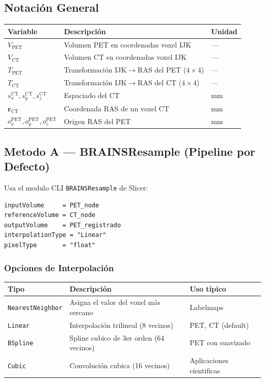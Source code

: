 \documentclass[12pt,a4paper]{article}
\begin{document}
\subsection{Notación General}

\begin{table}[H]
\centering
\begin{tabular}{lll}
\toprule
\textbf{Variable} & \textbf{Descripción} & \textbf{Unidad} \\
\midrule
$V_{\text{PET}}$ & Volumen PET en coordenadas voxel IJK & --- \\
$V_{\text{CT}}$ & Volumen CT en coordenadas voxel IJK & --- \\
$T_{\text{PET}}$ & Transformación IJK$\to$RAS del PET ($4\times4$) & --- \\
$T_{\text{CT}}$ & Transformación IJK$\to$RAS del CT ($4\times4$) & --- \\
$s_x^{\text{CT}}, s_y^{\text{CT}}, s_z^{\text{CT}}$ & Espaciado del CT & mm \\
$\mathbf{r}_{\text{CT}}$ & Coordenada RAS de un voxel CT & mm \\
$o_x^{\text{PET}}, o_y^{\text{PET}}, o_z^{\text{PET}}$ & Origen RAS del PET & mm \\
\bottomrule
\end{tabular}
\end{table}

\subsection{Metodo A --- BRAINSResample (Pipeline por Defecto)}

Usa el modulo CLI \texttt{BRAINSResample} de Slicer:

\begin{lstlisting}
inputVolume     = PET_node
referenceVolume = CT_node
outputVolume    = PET_registrado
interpolationType = "Linear"
pixelType       = "float"
\end{lstlisting}

\subsubsection{Opciones de Interpolación}

\begin{table}[H]
\centering
\begin{tabular}{l l l}
\toprule
\textbf{Tipo} & \textbf{Descripción} & \textbf{Uso típico} \\
\midrule
\texttt{NearestNeighbor} & Asigna el valor del voxel más cercano & Labelmaps \\
\texttt{Linear} & Interpolación trilineal (8 vecinos) & PET, CT (default) \\
\texttt{BSpline} & Spline cubico de 3er orden (64 vecinos) & PET con suavizado \\
\texttt{Cubic} & Convolución cubica (16 vecinos) & Aplicaciones cientificas \\
\bottomrule
\end{tabular}
\end{table}
\end{document}
